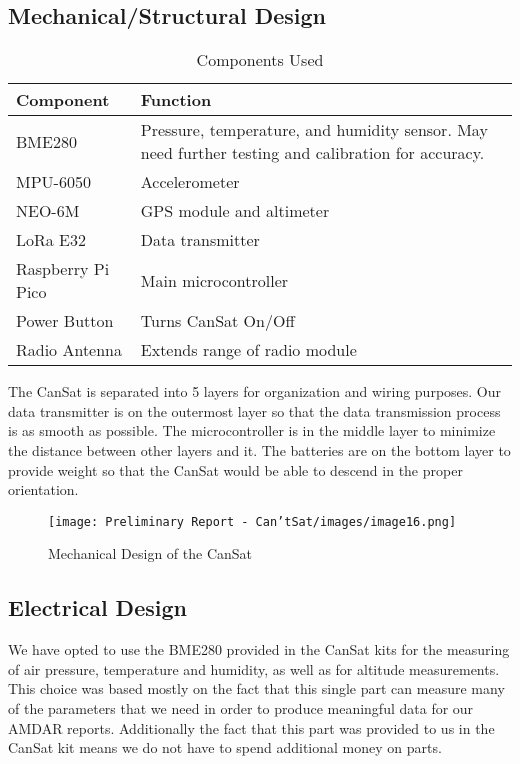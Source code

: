 \documentclass[10pt,twocolumn]{article}
\begin{document}
\subsection{\textbf{Mechanical/Structural Design}}

\begin{table}[H]
\centering
\begin{tabular}{|p{2.5cm}|p{4cm}|}
\hline
\textbf{Component} & \textbf{Function} \\\hline
BME280 & Pressure, temperature, and humidity sensor. May need further testing and calibration for accuracy. \\
MPU-6050 & Accelerometer \\
NEO-6M & GPS module and altimeter \\
LoRa E32 & Data transmitter \\
Raspberry Pi Pico & Main microcontroller \\
Power Button & Turns CanSat On/Off \\
Radio Antenna & Extends range of radio module \\
\hline
\end{tabular}
\caption{\label{tab:Components}Components Used}
\end{table}

The CanSat is separated into 5 layers for organization and wiring purposes. Our data transmitter is on the outermost layer so that the data transmission process is as smooth as possible. The microcontroller is in the middle layer to minimize the distance between other layers and it. The batteries are on the bottom layer to provide weight so that the CanSat would be able to descend in the proper orientation.

\begin{figure}[H]
\centering
\texttt{[image: Preliminary Report - Can'tSat/images/image16.png]}  
\caption{\label{fig:MechDesign} Mechanical Design of the CanSat}
\end{figure}

\subsection{\textbf{Electrical Design}}

We have opted to use the BME280 provided in the CanSat kits for the measuring of air pressure, temperature and humidity, as well as for altitude measurements. This choice was based mostly on the fact that this single part can measure many of the parameters that we need in order to produce meaningful data for our AMDAR reports. Additionally the fact that this part was provided to us in the CanSat kit means we do not have to spend additional money on parts.
\end{document}
